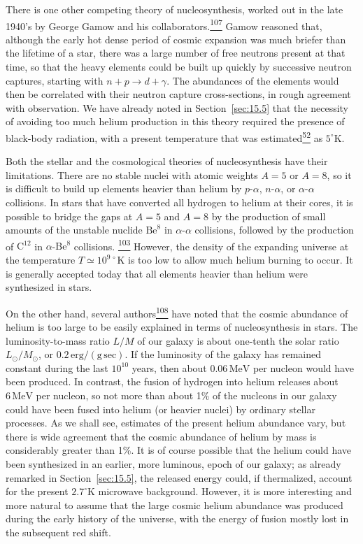 There is one other competing theory of nucleosynthesis, worked out in the
late 1940's by George Gamow and his
collaborators.\hyperref[ch15-ref-107]{\textsuperscript{107}} Gamow reasoned
that, although the early hot dense period of cosmic expansion was much briefer
than the lifetime of a star, there was a large number of free neutrons present
at that time, so that the heavy elements could be built up quickly by
successive neutron captures, starting with
\(n+p\to d+\gamma\). The abundances of the elements would then be correlated
with their neutron capture cross-sections, in rough agreement with
observation. We have already noted in Section~\ref{sec:15.5} that the
necessity of avoiding too much helium production in this theory required the
presence of black-body radiation, with a present temperature that was
estimated\hyperref[ch15-ref-52]{\textsuperscript{52}} as
\(5^\circ\mathrm K\).

Both the stellar and the cosmological theories of nucleosynthesis have their
limitations. There are no stable nuclei with atomic weights \(A=5\) or
\(A=8\), so it is difficult to build up elements heavier than helium by
\(p\)-\(\alpha\), \(n\)-\(\alpha\), or \(\alpha\)-\(\alpha\) collisions.
In stars that have converted all hydrogen to helium at their cores, it is
possible to bridge the gaps at \(A=5\) and \(A=8\) by the production of small
amounts of the unstable nuclide \(\mathrm{Be}^8\) in
\(\alpha\)-\(\alpha\) collisions, followed by the production of
\(\mathrm C^{12}\) in \(\alpha\)-\(\mathrm{Be}^8\) collisions.%
\hyperref[ch15-ref-103]{\textsuperscript{103}} However, the density of the
expanding universe at the temperature \(T\simeq10^{9\,\circ}\mathrm K\) is
too low to allow much helium burning to occur. It is generally accepted today
that all elements heavier than helium were synthesized in stars.

On the other hand, several
authors\hyperref[ch15-ref-108]{\textsuperscript{108}} have noted that the
cosmic abundance of helium is too large to be easily explained in terms of
nucleosynthesis in stars. The luminosity-to-mass ratio \(L/M\) of our galaxy
is about one-tenth the solar ratio \(L_\odot/M_\odot\), or
\(0.2\,\mathrm{erg/(g\,sec)}\). If the luminosity of the galaxy has remained
constant during the last \(10^{10}\) years, then about
\(0.06\,\mathrm{MeV}\) per nucleon would have been produced. In contrast,
the fusion of hydrogen into helium releases about \(6\,\mathrm{MeV}\) per
nucleon, so not more than about 1\% of the nucleons in our galaxy could have
been fused into helium (or heavier nuclei) by ordinary stellar processes. As
we shall see, estimates of the present helium abundance vary, but there is
wide agreement that the cosmic abundance of helium by mass is considerably
greater than 1\%. It is of course possible that the helium could have been
synthesized in an earlier, more luminous, epoch of our galaxy; as already
remarked in Section~\ref{sec:15.5}, the released energy could, if thermalized,
account for the present \(2.7^\circ\mathrm K\) microwave background. However,
it is more interesting and more natural to assume that the large cosmic
helium abundance was produced during the early history of the universe, with
the energy of fusion mostly lost in the subsequent red shift.

